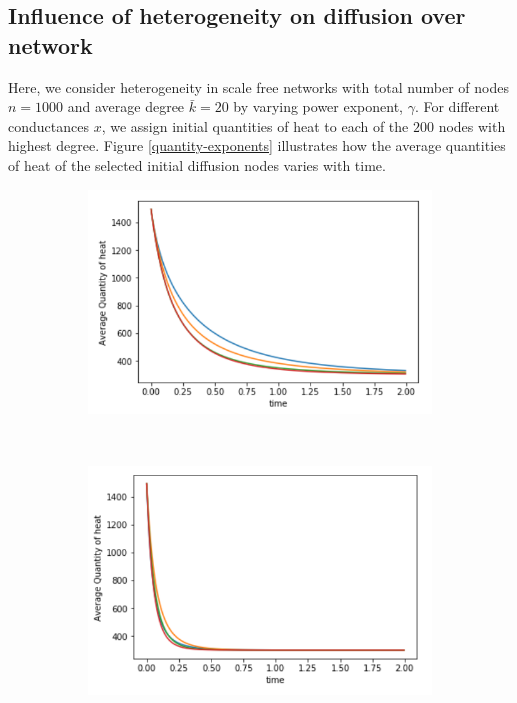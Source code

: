 \documentclass[10pt,a4paper]{article}
\theoremstyle{plain}
\theoremstyle{definition}
\begin{document}
     \subsection{Influence of heterogeneity on diffusion over network}
     
     Here, we consider heterogeneity in scale free networks with total number of nodes $n=1000$ and average degree $\bar{k}=20$ by varying power exponent, $\gamma$. For different conductances $x$, we assign initial quantities of heat to each of the $200$ nodes with highest degree. Figure \ref{quantity-exponents} illustrates how the average quantities of heat of the selected initial diffusion nodes varies with time.
     \begin{figure}[H]
     	\centering
     	\begin{subfigure}[b]{0.35\textwidth}
     		\includegraphics[width=\textwidth]{images/quantity-time-exponents-x0.png}
     	\end{subfigure}~
     	\begin{subfigure}[b]{0.35\textwidth}
     		\includegraphics[width= \textwidth]{images/quantity-time-exponents-x01.png}

\end{subfigure}
\end{figure}
\end{document}
